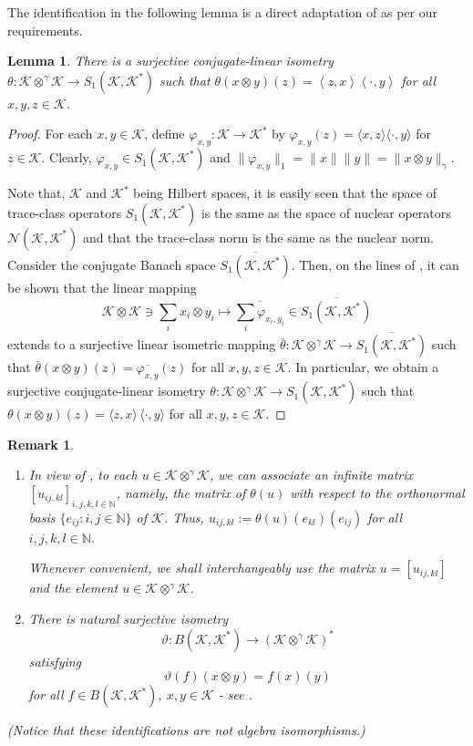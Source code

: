 \documentclass[a4]{amsart}
\theoremstyle{cupthm}
\newtheorem{lemma}[thm]{Lemma}
\theoremstyle{cupdefn}
\theoremstyle{cuprem}
\newtheorem{rem}[thm]{Remark}
\numberwithin{equation}{section}
\newcommand{\ot}{\otimes}
\newcommand{\obp}{\otimes^{\gamma}}
\newcommand{\N}{\mathbb N}
\newcommand{\rar}{\rightarrow}
\newcommand{\mK}{\mathcal{K}}
\def\la{\langle}
\def\ra{\rangle}
\begin{document}
The identification in the following lemma is a direct adaptation of
\cite[Corollary 4.11]{Ryan} as per our requirements.
\begin{lemma}\label{obp-to-S1}
 There is a surjective conjugate-linear isometry $\theta:\mathcal
 K\obp\mathcal K \to S_1(\mathcal K,\mK^*)$ such that $\theta(x
 \otimes y)(z)=\left<z,x\right>\left<\cdot,y\right>$ for all $x,y, z
 \in \mK$.
\end{lemma}
\begin{proof}
For each $x , y \in \mK$, define $\varphi_{x,y}: \mK \rar \mK^*$ by
$\varphi_{x,y}(z) = \la x, z\ra \la \cdot, y\ra$ for $z\in
\mK$. Clearly, $\varphi_{x,y} \in S_1(\mK, \mK^*)$ and
$\|\varphi_{x,y}\|_1 = \|x\| \|y\| = \|x \ot y\|_{\gamma}$.

Note that, $\mK$ and $\mK^*$ being Hilbert spaces, it is easily
seen that the space of trace-class operators $S_1(\mK, \mK^*)$ is the
same as the space of nuclear operators $\mathcal{N}(\mK, \mK^*)$ and
that the trace-class norm is the same as the nuclear norm.  Consider the
conjugate Banach space $\overline{S_1(\mathcal{K},
  \mathcal{K}^*)}$. Then, on the lines of \cite[Corollary 4.11]{Ryan},
it can be shown that the linear mapping
\[
 \mK \ot \mK   \ni \sum_i x_i \ot
y_i \mapsto   \overline{\sum_i
  \varphi_{x_i, y_i}} \in \overline{S_1(\mK, \mK^*)}
\]
extends to a surjective linear isometric mapping
$\overline{\theta}:\mK \obp \mK\rar \overline{S_1(\mK, \mK^*)}$ such
that $\overline{\theta}(x\ot y)(z) = \overline{\varphi_{x,y}}(z)$ for all
$x,y, z \in \mK$. In particular, we obtain a surjective
conjugate-linear isometry $\theta:\mK \obp \mK \rar S_1(\mK, \mK^*)$
such that $\theta(x\ot y)(z) = \la z, x\ra \,\la \cdot, y\ra$ for all
$x,y, z \in \mK$.
\end{proof}
\begin{rem}\label{natural-identifications}
\begin{enumerate}
 \item In view of , to each $u\in \mathcal K\obp\mathcal K$, we
   can associate an infinite matrix $[u_{ij, kl}]_{i,j,k,l\in \mathbb
     N}$, namely, the matrix of $\theta(u)$ with respect to the
   orthonormal basis $\{e_{ij} :i, j \in \N\}$ of $\mK$. Thus, $u_{ij,
     kl}:=\theta(u)(e_{kl})(e_{ij})$ for all $i, j, k, l
   \in \N$.\smallskip

Whenever convenient, we shall interchangeably use the
matrix  $u=\left[u_{ij, kl}\right]$ and
the element $u \in \mathcal K\obp\mathcal K$.

\item  There is natural
  surjective isometry
  \[
  \vartheta: B(\mathcal K,\mathcal K^*) \to
  (\mathcal{K}\obp\mathcal K)^*
  \]
  satisfying
	\[
	 \vartheta(f)\left(x \otimes y\right)= f(x)(y)
         \]
         for all $f \in B(\mK,\mK^*)$, $x,y\in \mK$ - see \cite[pg 24]{Ryan}.
\end{enumerate}
          (Notice that these identifications are not  algebra isomorphisms.) 

\end{rem}
 
\end{document}
